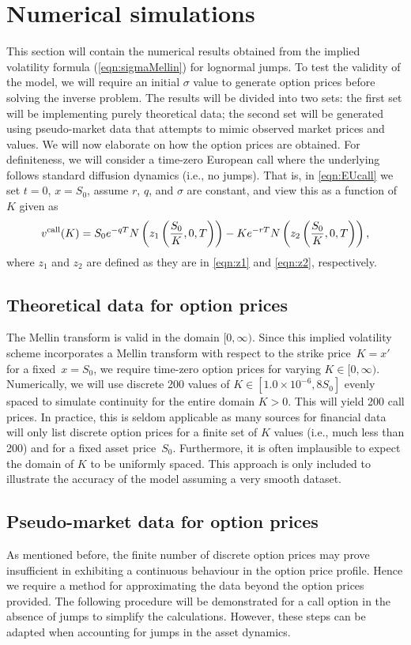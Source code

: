 \section{Numerical simulations}
\label{sec:numerics}
This section will contain the numerical results obtained from the implied volatility formula (\ref{eqn:sigmaMellin}) for lognormal jumps. To test the validity of the model, we will require an initial $\sigma$ value to generate option prices before solving the inverse problem. The results will be divided into two sets: the first set will be implementing purely theoretical data; the second set will be generated using pseudo-market data that attempts to mimic observed market prices and values. We will now elaborate on how the option prices are obtained. For definiteness, we will consider a time-zero European call where the underlying follows standard diffusion dynamics (i.e., no jumps). That is, in \eqref{eqn:EUcall} we set $t = 0$, $x = S_0$, assume $r$, $q$, and $\sigma$ are constant, and view this as a function of $K$ given as
	\begin{equation}
		\label{eqn:EUcallK}
		v^{\text{call}}(K) = S_0e^{-qT}N\left( z_1\left( \frac{S_0}{K}, 0, T \right) \right) - Ke^{-rT}N\left( z_2\left( \frac{S_0}{K}, 0, T \right) \right),
	\end{equation}
where $z_1$ and $z_2$ are defined as they are in \eqref{eqn:z1} and \eqref{eqn:z2}, respectively.

\subsection{Theoretical data for option prices}
The Mellin transform is valid in the domain $[0,\infty)$. Since this implied volatility scheme incorporates a Mellin transform with respect to the strike price~$K = x'$ for a fixed~$x = S_0$, we require time-zero option prices for varying $K \in [0,\infty)$. Numerically, we will use discrete 200 values of $K \in [1.0\times10^{-6},8S_0]$ evenly spaced to simulate continuity for the entire domain $K > 0$. This will yield 200 call prices.  In practice, this is seldom applicable as many sources for financial data will only list discrete option prices for a finite set of $K$ values (i.e., much less than 200) and for a fixed asset price~$S_0$. Furthermore, it is often implausible to expect the domain of $K$ to be uniformly spaced. This approach is only included to illustrate the accuracy of the model assuming a very smooth dataset.

\subsection{Pseudo-market data for option prices}
As mentioned before, the finite number of discrete option prices may prove insufficient in exhibiting a continuous behaviour in the option price profile. Hence we require a method for approximating the data beyond the option prices provided. The following procedure will be demonstrated for a call option in the absence of jumps to simplify the calculations. However, these steps can be adapted when accounting for jumps in the asset dynamics.

